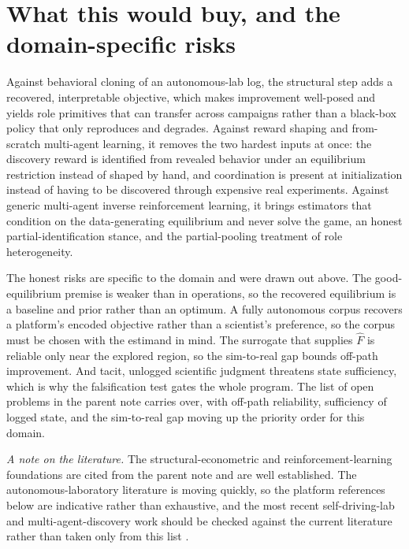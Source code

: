 \documentclass[11pt]{article}
\theoremstyle{definition}
\begin{document}
\section{What this would buy, and the domain-specific risks}

Against behavioral cloning of an autonomous-lab log, the structural step adds a recovered, interpretable objective, which makes improvement well-posed and yields role primitives that can transfer across campaigns rather than a black-box policy that only reproduces and degrades. Against reward shaping and from-scratch multi-agent learning, it removes the two hardest inputs at once: the discovery reward is identified from revealed behavior under an equilibrium restriction instead of shaped by hand, and coordination is present at initialization instead of having to be discovered through expensive real experiments. Against generic multi-agent inverse reinforcement learning, it brings estimators that condition on the data-generating equilibrium and never solve the game, an honest partial-identification stance, and the partial-pooling treatment of role heterogeneity.

The honest risks are specific to the domain and were drawn out above. The good-equilibrium premise is weaker than in operations, so the recovered equilibrium is a baseline and prior rather than an optimum. A fully autonomous corpus recovers a platform's encoded objective rather than a scientist's preference, so the corpus must be chosen with the estimand in mind. The surrogate that supplies $\hat F$ is reliable only near the explored region, so the sim-to-real gap bounds off-path improvement. And tacit, unlogged scientific judgment threatens state sufficiency, which is why the falsification test gates the whole program. The list of open problems in the parent note carries over, with off-path reliability, sufficiency of logged state, and the sim-to-real gap moving up the priority order for this domain.

\bigskip
\noindent\emph{A note on the literature.} The structural-econometric and reinforcement-learning foundations are cited from the parent note and are well established. The autonomous-laboratory literature is moving quickly, so the platform references below are indicative rather than exhaustive, and the most recent self-driving-lab and multi-agent-discovery work should be checked against the current literature rather than taken only from this list \citep{maffettone2023, seifrid2022, bran2024}.
\end{document}
